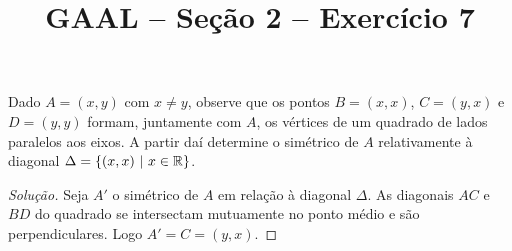 \documentclass[a4paper,11pt]{article}
\title{GAAL -- Seção 2 -- Exercício 7}
\author{\empty}
\date{\empty}
\newcommand\onlyinsubfileone\maketitle
\begin{document}
\onlyinsubfileone

\begin{exercicio-gaal}[E7.S2]
  Dado $A = (x,y)$ com $x \neq y$, observe que os pontos $B = (x,x)$, $C = (y,x)$ e $D = (y,y)$ formam, juntamente com $A$, os vértices de um quadrado de lados paralelos aos eixos.
  A partir daí determine o simétrico de $A$ relativamente à diagonal $\Delta = \{(x,x) \ | \ x \in \mathbb{R} \}$.
\end{exercicio-gaal}

\begin{proof}[Solução]
  Seja $A'$ o simétrico de $A$ em relação à diagonal $\Delta$.
  As diagonais $AC$ e $BD$ do quadrado se intersectam mutuamente no ponto médio e são perpendiculares.
  Logo $A' = C = (y,x)$.
\end{proof}
\end{document}
